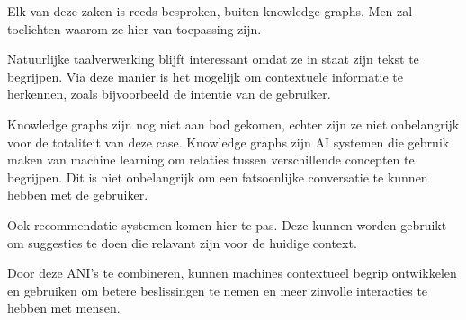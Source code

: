 Elk van deze zaken is reeds besproken, buiten knowledge graphs. Men zal toelichten waarom ze hier van toepassing zijn.

Natuurlijke taalverwerking blijft interessant omdat ze in staat zijn tekst te begrijpen. Via deze manier is het mogelijk om contextuele informatie te herkennen, zoals bijvoorbeeld de intentie van de gebruiker.

Knowledge graphs zijn nog niet aan bod gekomen, echter zijn ze niet onbelangrijk voor de totaliteit van deze case. Knowledge graphs zijn AI systemen die gebruik maken van machine learning om relaties tussen verschillende concepten te begrijpen. Dit is niet onbelangrijk om een fatsoenlijke conversatie te kunnen hebben met de gebruiker.

Ook recommendatie systemen komen hier te pas. Deze kunnen worden gebruikt om suggesties te doen die relavant zijn voor de huidige context.

Door deze ANI's te combineren, kunnen machines contextueel begrip ontwikkelen en gebruiken om betere beslissingen te nemen en meer zinvolle interacties te hebben met mensen.
